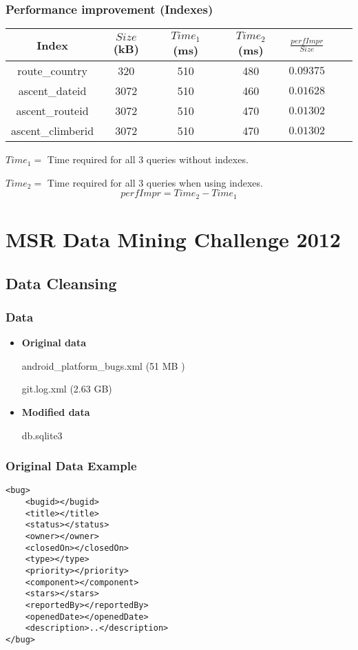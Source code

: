 \documentclass[]{beamer}
\begin{document}
\begin{frame}
\frametitle{Performance improvement (Indexes)}

\begin{table}[ht!]
\begin{tabular}{|c|c|c|c|c|c|c|}
\hline
Index & $Size$(kB) & $Time_{1}$ (ms) & $Time_{2}$ (ms) & $\frac{perfImpr}{Size}$\tabularnewline
\hline
\hline
route\_country & 320 & 510 & 480 & $0.09375$\tabularnewline
\hline 
ascent\_dateid & 3072 & 510 & 460 & $0.01628$ \tabularnewline
\hline 
ascent\_routeid & 3072 & 510 & 470 & $0.01302$ \tabularnewline
\hline 
ascent\_climberid & 3072 & 510 & 470 & $0.01302$ \tabularnewline
\hline 
\end{tabular}
\end{table}
$Time_{1} =$ Time required for all 3 queries without indexes.

$Time_{2} =$ Time required for all 3 queries when using indexes.
\[perfImpr = Time_{2} - Time_{1}\]
\end{frame}

\section{MSR Data Mining Challenge 2012}
\subsection{Data Cleansing}

\begin{frame}
\frametitle{Data}
\begin{itemize}
\item \textbf{Original data}

  android\_platform\_bugs.xml (51 MB )
  
  git.log.xml (2.63 GB)
\item \textbf{Modified data}

db.sqlite3
\end{itemize}
\end{frame}

\begin{frame}[fragile]
\frametitle{Original Data Example}
\begin{lstlisting}
<bug>
	<bugid></bugid>
	<title></title>
	<status></status>
	<owner></owner>
	<closedOn></closedOn>
	<type></type>
	<priority></priority>
	<component></component>
	<stars></stars>
	<reportedBy></reportedBy>
	<openedDate></openedDate>
	<description>..</description>
</bug>
\end{lstlisting}
\end{frame}
\end{document}
